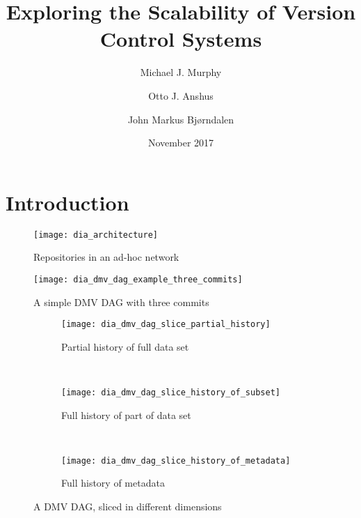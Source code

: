 \documentclass[
    usenglish,
]{nik}
\title{Exploring the Scalability of Version Control Systems}
\author{Michael J. Murphy \and Otto J. Anshus \and John Markus Bjørndalen}
\date{November 2017}
\begin{document}
\maketitle

\begin{abstract}

\end{abstract}

\section{Introduction}


\begin{figure}[]
    \centering
    \texttt{[image: dia\_architecture]}
    \caption{Repositories in an ad-hoc network}
    \label{fig:dia_architecture}
\end{figure}

\begin{figure}[]
    \centering
    \texttt{[image: dia\_dmv\_dag\_example\_three\_commits]}
    \caption{A simple DMV DAG with three commits}
    \label{dia_dmv_dag_example_three_commits}
\end{figure}


\newcommand{\slicediagramwidth}{0.45\textwidth}

\begin{figure}[]

    \centering

    \begin{subfigure}[]{\slicediagramwidth}
        \texttt{[image: dia\_dmv\_dag\_slice\_partial\_history]}
        \caption{Partial history of full data set}
        \label{dia_dmv_dag_slice_partial_history}
    \end{subfigure}
    ~
    \begin{subfigure}[]{\slicediagramwidth}
        \texttt{[image: dia\_dmv\_dag\_slice\_history\_of\_subset]}
        \caption{Full history of part of data set}
        \label{dia_dmv_dag_slice_history_of_subset}
    \end{subfigure}
    ~
    \begin{subfigure}[]{\slicediagramwidth}
        \texttt{[image: dia\_dmv\_dag\_slice\_history\_of\_metadata]}
        \caption{Full history of metadata}
        \label{dia_dmv_dag_slice_history_of_metadata}
    \end{subfigure}

    \caption{A DMV DAG, sliced in different dimensions}
\end{figure}



\printbibliography[]

\listoftodos

\ifoptionfinal{}{
    
}
\end{document}
